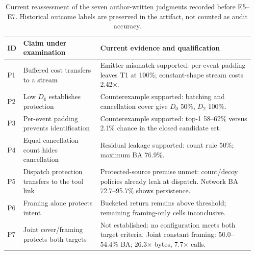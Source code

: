 \begin{table}[t]\centering\footnotesize
\caption{Current reassessment of the seven author-written judgments recorded before E5--E7. Historical outcome labels are preserved in the artifact, not counted as audit accuracy.}\label{tab:transfer-predictions}
\begin{tabularx}{\textwidth}{@{}lp{}Y@{}}\toprule
ID & Claim under examination & Current evidence and qualification\\\midrule
P1 & Buffered cost transfers to a stream & Emitter mismatch supported: per-event padding leaves T1 at 100\%; constant-shape stream costs 2.42$\times$.\\
P2 & Low $D_0$ establishes protection & Counterexample supported: batching and cancellation cover give $D_0$ 50\%, $D_2$ 100\%.\\
P3 & Per-event padding prevents identification & Counterexample supported: top-1 58--62\% versus 2.1\% chance in the closed candidate set.\\
P4 & Equal cancellation count hides cancellation & Residual leakage supported: count rule 50\%; maximum BA 76.9\%.\\
P5 & Dispatch protection transfers to the tool link & Protected-source premise unmet: count/decoy policies already leak at dispatch. Network BA 72.7--95.7\% shows persistence.\\
P6 & Framing alone protects intent & Bucketed return remains above threshold; remaining framing-only cells inconclusive.\\
P7 & Joint cover/framing protects both targets & Not established: no configuration meets both target criteria. Joint constant framing: 50.0--54.4\% BA; 26.3$\times$ bytes, 7.7$\times$ calls.\\
\bottomrule\end{tabularx}
\end{table}
